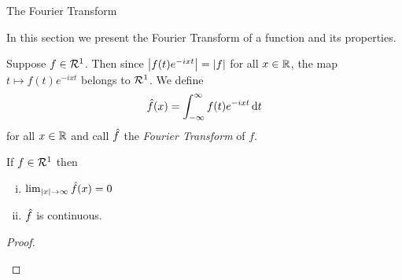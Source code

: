 \begin{section}{The Fourier Transform}

	In this section we present the Fourier Transform
	of a function and its properties.
	

\begin{defn}
	Suppose $f \in \mathcal{R}^1$. Then since $\left \vert {f(t)e^{-ixt}} \right \vert
	= \left \vert {f} \right \vert$ for all ${x} \in \mathbb{R}$, the map $t \mapsto f(t)e^{-ixt}$
	belongs to $\mathcal{R}^1$. We define
		\begin{displaymath}
			\hat{f}(x)=\int_{-\infty}^{\infty}{f(t)e^{-ixt}}\, \mathrm{d}{t}
		\end{displaymath}
	for all ${x} \in \mathbb{R}$ and call $\hat{f}$ the \emph{Fourier Transform} of $f$.
\end{defn}


\begin{thrm}
	If $f \in \mathcal{R}^1$ then
		\begin{enumerate}[i)]
			\item
				$\lim_{\left \vert {x} \right \vert \rightarrow \infty} \hat{f}(x)=0$
			\item
				$\hat{f}$ is continuous.
		\end{enumerate}
\end{thrm}

\begin{proof}
	\begin{enumerate}[i)]
	

\end{enumerate}
\end{proof}
\end{section}
